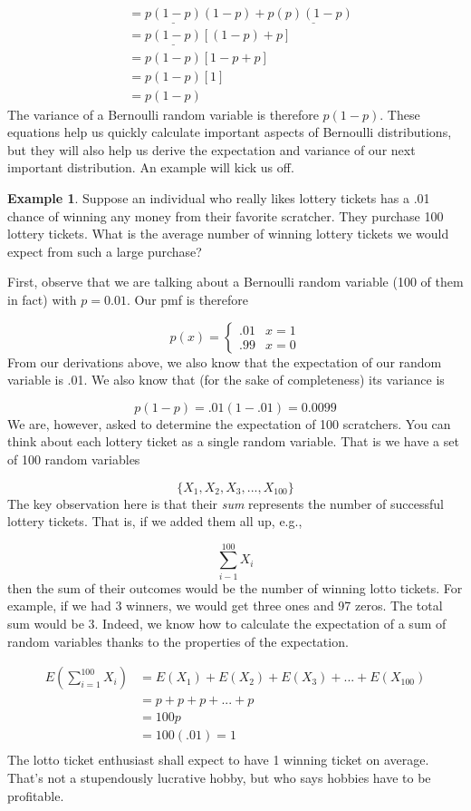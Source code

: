 \documentclass[
]{book}
\theoremstyle{definition}
\theoremstyle{definition}
\newtheorem{example}{Example}[chapter]
\theoremstyle{definition}
\theoremstyle{definition}
\theoremstyle{remark}
\begin{document}
\begin{align}
&= \underline{p(1-p)}(1-p) + p\underline{(p)(1-p)} \\
&= \underline{p(1-p)}[(1-p) + p] \\
&= p(1-p)[1-p+p] \\
&= p(1-p)[1] \\ 
&= p(1-p)
\end{align}
\label{eq:bernvariance}
The variance of a Bernoulli random variable is therefore \(p(1-p)\). These equations help us quickly calculate important aspects of Bernoulli distributions, but they will also help us derive the expectation and variance of our next important distribution. An example will kick us off.

\begin{example}
Suppose an individual who really likes lottery tickets has a .01 chance of winning any money from their favorite scratcher. They purchase 100 lottery tickets. What is the average number of winning lottery tickets we would expect from such a large purchase?

First, observe that we are talking about a Bernoulli random variable (100 of them in fact) with \(p = 0.01\). Our pmf is therefore

\[
p(x) = 
\begin{cases}
.01 & x = 1 \\
.99 & x = 0 
\end{cases}
\]
From our derivations above, we also know that the expectation of our random variable is .01. We also know that (for the sake of completeness) its variance is

\[
p(1-p) = .01(1-.01) = 0.0099 
\]
We are, however, asked to determine the expectation of 100 scratchers. You can think about each lottery ticket as a single random variable. That is we have a set of 100 random variables

\[
\{X_1, X_2, X_3,...,X_{100}\}
\]
The key observation here is that their \emph{sum} represents the number of successful lottery tickets. That is, if we added them all up, e.g.,

\[
\sum_{i-1}^{100} X_i
\]
then the sum of their outcomes would be the number of winning lotto tickets. For example, if we had 3 winners, we would get three ones and 97 zeros. The total sum would be 3. Indeed, we know how to calculate the expectation of a sum of random variables thanks to the properties of the expectation.

\begin{align}
E(\sum_{i=1}^{100} X_i) &= E(X_1) + E(X_2) + E(X_3) + ... + E(X_{100}) \\
&= p + p + p + ... + p \\
&= 100p \\
&= 100(.01) = 1 \\
\end{align}
The lotto ticket enthusiast shall expect to have 1 winning ticket on average. That's not a stupendously lucrative hobby, but who says hobbies have to be profitable.


\end{example}
\end{document}
